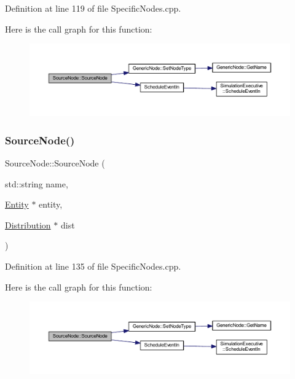 Definition at line 119 of file Specific\+Nodes.\+cpp.

Here is the call graph for this function\+:
\nopagebreak
\begin{figure}[H]
\begin{center}
\leavevmode
\includegraphics[width=350pt]{class_source_node_aad28db9c905ffdccd8013bc1e4481848_cgraph}
\end{center}
\end{figure}
\mbox{\label{class_source_node_ab287553b2a359c578f4579bd467806a2}} 
\subsubsection{\texorpdfstring{Source\+Node()}{SourceNode()}\hspace{0.1cm}{\footnotesize\ttfamily [3/3]}}
{\footnotesize\ttfamily Source\+Node\+::\+Source\+Node (\begin{DoxyParamCaption}\item[{std\+::string}]{name,  }\item[{\hyperlink{class_entity}{Entity} $\ast$}]{entity,  }\item[{\hyperlink{class_distribution}{Distribution} $\ast$}]{dist }\end{DoxyParamCaption})}



Definition at line 135 of file Specific\+Nodes.\+cpp.

Here is the call graph for this function\+:
\nopagebreak
\begin{figure}[H]
\begin{center}
\leavevmode
\includegraphics[width=350pt]{class_source_node_ab287553b2a359c578f4579bd467806a2_cgraph}
\end{center}
\end{figure}


